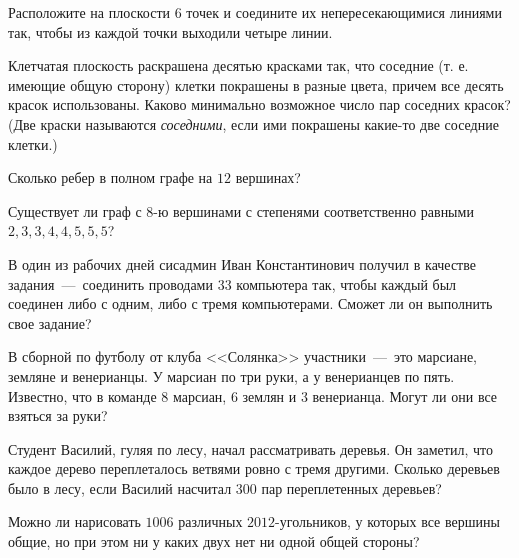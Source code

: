 \begin{exersize}
	Расположите на плоскости 6 точек и соедините их непересекающимися линиями так, чтобы из каждой точки выходили четыре линии.
\end{exersize}

\begin{exersize}
	Клетчатая плоскость раскрашена десятью красками так, что соседние (т. е. имеющие общую сторону) клетки покрашены в разные цвета, причем все десять красок использованы. Каково минимально возможное число пар соседних красок? (Две краски называются \emph{соседними}, если ими покрашены какие-то две соседние клетки.)
\end{exersize}

\begin{exersize}
	Сколько ребер в полном графе на $12$ вершинах?
\end{exersize}

\begin{exersize}
	Существует ли граф с $8$-ю вершинами с степенями соответственно равными $2, 3, 3, 4, 4, 5, 5, 5$?
\end{exersize}

\begin{exersize}
	В один из рабочих дней сисадмин Иван Константинович получил в качестве задания~---~соединить проводами $33$ компьютера так, чтобы каждый был соединен либо с одним, либо с тремя компьютерами. Сможет ли он выполнить свое задание?
\end{exersize}

\begin{exersize}
	В сборной по футболу от клуба <<Солянка>> участники~---~это марсиане, земляне и венерианцы. У марсиан по три руки, а у венерианцев по пять. Известно, что в команде $8$ марсиан, $6$ землян и $3$ венерианца. Могут ли они все взяться за руки?
\end{exersize}

\begin{exersize}
	Студент Василий, гуляя по лесу, начал рассматривать деревья. Он заметил, что каждое дерево переплеталось ветвями ровно с тремя другими. Сколько деревьев было в лесу, если Василий насчитал $300$ пар переплетенных деревьев?
\end{exersize}

\begin{exersize}
	Можно ли нарисовать $1006$ различных $2012$-угольников, у которых все вершины общие, но при этом ни у каких двух нет ни одной общей стороны?
\end{exersize}

